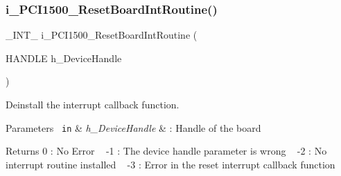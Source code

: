 \mbox{\label{group___interrupt_gaaa6708d373bb256b37c0c4cd42953ee6}} 
\subsubsection{\texorpdfstring{i\_PCI1500\_ResetBoardIntRoutine()}{i\_PCI1500\_ResetBoardIntRoutine()}}
{\footnotesize\ttfamily \+\_\+\+I\+N\+T\+\_\+ i\+\_\+\+P\+C\+I1500\+\_\+\+Reset\+Board\+Int\+Routine (\begin{DoxyParamCaption}\item[{H\+A\+N\+D\+LE}]{h\+\_\+\+Device\+Handle }\end{DoxyParamCaption})}

Deinstall the interrupt callback function.


\begin{DoxyParams}[1]{Parameters}
\mbox{\texttt{ in}}  & {\em h\+\_\+\+Device\+Handle} & \+: Handle of the board\\
\hline
\end{DoxyParams}
\begin{DoxyReturn}{Returns}
0 \+: No Error ~\newline
 -\/1 \+: The device handle parameter is wrong ~\newline
 -\/2 \+: No interrupt routine installed ~\newline
 -\/3 \+: Error in the reset interrupt callback function ~\newline

\end{DoxyReturn}
